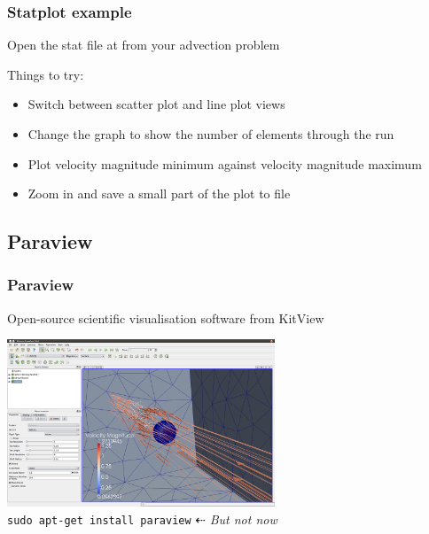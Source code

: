 \documentclass[12pt]{beamer}
\begin{document}
\begin{frame}
    \frametitle{Statplot example}
Open the stat file at from your advection problem

Things to try:
\begin{itemize}
\item Switch between scatter plot and line plot views
\item Change the graph to show the number of elements through the run
\item Plot velocity magnitude minimum against velocity magnitude maximum
\item Zoom in and save a small part of the plot to file
\end{itemize}
\end{frame}


\subsection{Paraview}
\begin{frame}
    \frametitle{Paraview}
Open-source scientific visualisation software from KitView
\begin{center}
\includegraphics[width=0.6\textwidth]{images/paraview_example.png}\\
\vspace{5mm}
{\tt sudo apt-get install paraview} $\dashleftarrow$ \emph{\color{red}But not now}
\end{center}
\end{frame}
\end{document}
